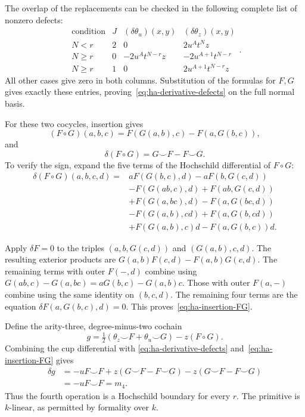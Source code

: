 The overlap of the replacements can be checked in the following
complete list of nonzero defects:
\[
 \begin{array}{c|c|c|c}
 \text{condition}&J&(\delta\theta_u)(x,y)&(\delta\theta_z)(x,y)\\\hline
 N<r&2&0&2u^At^Nz\\
 N\geq r&0&-2u^At^{N-r}z&-2u^{A+1}t^{N-r}\\
 N\geq r&1&0&2u^{A+1}t^{N-r}z
 \end{array}.
\]
All other cases give zero in both columns.
Substitution of the formulas for $F,G$ gives exactly these entries,
proving~\eqref{eq:ha-derivative-defects} on the full normal basis.

For these two cocycles, insertion gives
\[
 (F\circ G)(a,b,c)=F(G(a,b),c)-F(a,G(b,c)),
\]
and
\begin{equation}\label{eq:ha-insertion-FG}
 \delta(F\circ G)=G\smile F-F\smile G.
\end{equation}
To verify the sign, expand the five terms of the Hochschild
differential of $F\circ G$:
\[
 \begin{split}
 \delta(F\circ G)(a,b,c,d)
 ={}&aF(G(b,c),d)-aF(b,G(c,d))\\
 &-F(G(ab,c),d)+F(ab,G(c,d))\\
 &+F(G(a,bc),d)-F(a,G(bc,d))\\
 &-F(G(a,b),cd)+F(a,G(b,cd))\\
 &+F(G(a,b),c)d-F(a,G(b,c))d.
 \end{split}
\]

Apply $\delta F=0$ to the triples $(a,b,G(c,d))$ and
$(G(a,b),c,d)$. The resulting exterior products are
$G(a,b)F(c,d)-F(a,b)G(c,d)$.
The remaining terms with outer $F(-,d)$ combine using
$G(ab,c)-G(a,bc)=aG(b,c)-G(a,b)c$.
Those with outer $F(a,-)$ combine using the same identity on
$(b,c,d)$. The remaining four terms are the equation
$\delta F(a,G(b,c),d)=0$.
This proves~\eqref{eq:ha-insertion-FG}.

Define the arity-three, degree-minus-two cochain
\begin{equation}\label{eq:ha-g-definition}
 g=\tfrac12(\theta_z\smile F+\theta_u\smile G)-z(F\circ G).
\end{equation}
Combining the cup differential with
\eqref{eq:ha-derivative-defects} and~\eqref{eq:ha-insertion-FG} gives
\[
 \begin{split}
 \delta g
 &=-uF\smile F+z(G\smile F-F\smile G)
                  -z(G\smile F-F\smile G)\\
 &=-uF\smile F=m_4.
 \end{split}
\]
Thus the fourth operation is a Hochschild boundary for every $r$.
The primitive is $k$-linear, as permitted by formality over $k$.

